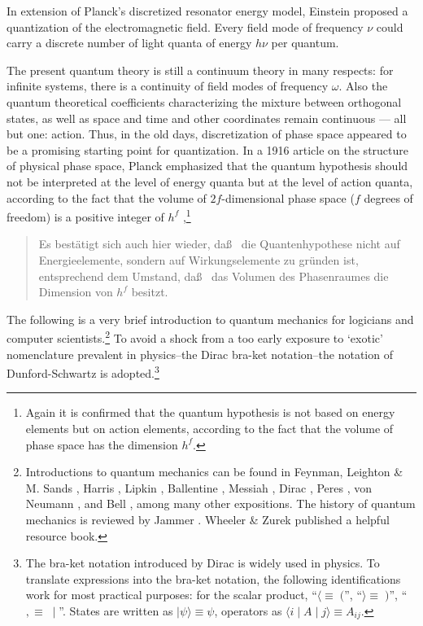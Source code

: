 In extension of Planck's discretized resonator energy model,
Einstein \cite{ein-5} proposed a quantization of the
electromagnetic field. Every field mode of frequency $\nu$ could
carry a discrete  number of light quanta of energy
$h\nu$ per quantum.


The present quantum theory is still a continuum theory in many
respects: for infinite systems,
there is a continuity of field modes of frequency $\omega$.
Also the quantum theoretical coefficients characterizing the mixture
between orthogonal states, as well as
space and time and other coordinates
remain continuous --- all but one: action.
Thus, in the old days, discretization of
phase space
appeared to be a promising starting point for quantization.
In a 1916 article on the structure of physical phase space,
Planck emphasized that the quantum hypothesis should
not be interpreted at the level of energy quanta but at the level of
action quanta, according to the fact that the volume of $2f$-dimensional
phase space ($f$ degrees of freedom) is a positive integer of $h^f$
 \cite[p. 387]{planck:1916},\footnote{
Again it is confirmed that the quantum hypothesis is not based on energy
elements but on action elements, according to the fact that the volume
of phase space has the dimension $h^f$.
}
\begin{quote}
Es best\"atigt sich auch hier wieder, da\ss~ die Quantenhypothese nicht
auf Energieelemente, sondern auf Wirkungselemente zu gr\"unden ist,
entsprechend dem Umstand, da\ss~ das Volumen des Phasenraumes die
Dimension von $h^f$ besitzt.
\end{quote}



The following is a very brief introduction to quantum mechanics for
logicians and computer scientists.\footnote{
Introductions to quantum mechanics can be found in
Feynman, Leighton \& M. Sands \cite{feynman-III},
Harris \cite{har},
Lipkin \cite{lipkin},
Ballentine  \cite{ba-89},
Messiah  \cite{messiah-61},
Dirac \cite{dirac},
Peres \cite{peres},
von Neumann \cite{v-neumann-49}, and
Bell \cite{bell-87}, among many other expositions.
The history of quantum mechanics is reviewed by
Jammer \cite{jammer1}.
Wheeler \& Zurek \cite{wheeler-Zurek:83} published a helpful resource
book.}
To avoid a shock from a too early exposure  to `exotic'
nomenclature prevalent in physics--the Dirac bra-ket notation--the
notation of Dunford-Schwartz
\cite{dunford-schwartz} is adopted.\footnote{
The bra-ket
notation introduced by Dirac is widely used in physics. To
translate expressions into the bra-ket notation, the following
identifications work for most practical purposes: for the scalar
product,
``$\langle  \equiv \;($'',
``$\rangle  \equiv \; )$'',
``$, \equiv \; \mid $''.
States are written as
$\mid  \psi \rangle  \equiv \psi$, operators as
$\langle  i\mid  A\mid  j \rangle  \equiv A_{ij}$.}

